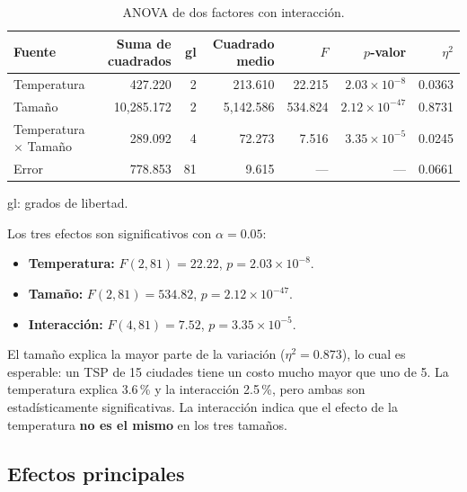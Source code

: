 \documentclass[11pt,letterpaper]{article}
\begin{document}
\begin{table}[H]
  \centering
  \caption{ANOVA de dos factores con interacción.}
  \label{tab:anova}
  \footnotesize
  \setlength{\tabcolsep}{6pt}
  \renewcommand{\arraystretch}{1.2}
  \begin{tabular}{@{}lrrrrrr@{}}
    \toprule
    Fuente & Suma de cuadrados & gl & Cuadrado medio & $F$ & $p$-valor & $\eta^2$ \\
    \midrule
    Temperatura           & 427.220    & 2 & 213.610   & 22.215  & $2.03\times10^{-8}$  & 0.0363 \\
    Tamaño                & 10,285.172 & 2 & 5,142.586 & 534.824 & $2.12\times10^{-47}$ & 0.8731 \\
    Temperatura $\times$ Tamaño & 289.092 & 4 & 72.273 & 7.516 & $3.35\times10^{-5}$ & 0.0245 \\
    Error                 & 778.853    & 81 & 9.615    & ---     & ---                  & 0.0661 \\
    \bottomrule
  \end{tabular}

  \vspace{2pt}
  \begin{minipage}{\linewidth}
    \footnotesize gl: grados de libertad.
  \end{minipage}
\end{table}

Los tres efectos son significativos con $\alpha = 0.05$:

\begin{itemize}
  \item \textbf{Temperatura:} $F(2,81) = 22.22$, $p = 2.03\times10^{-8}$.
  \item \textbf{Tamaño:} $F(2,81) = 534.82$, $p = 2.12\times10^{-47}$.
  \item \textbf{Interacción:} $F(4,81) = 7.52$, $p = 3.35\times10^{-5}$.
\end{itemize}

El tamaño explica la mayor parte de la variación ($\eta^2 = 0.873$), lo cual
es esperable: un TSP de 15 ciudades tiene un costo mucho mayor que uno de 5.
La temperatura explica 3.6\,\% y la interacción 2.5\,\%, pero ambas son
estadísticamente significativas. La interacción indica que el efecto de la
temperatura \textbf{no es el mismo} en los tres tamaños.

\subsection{Efectos principales}
\end{document}
